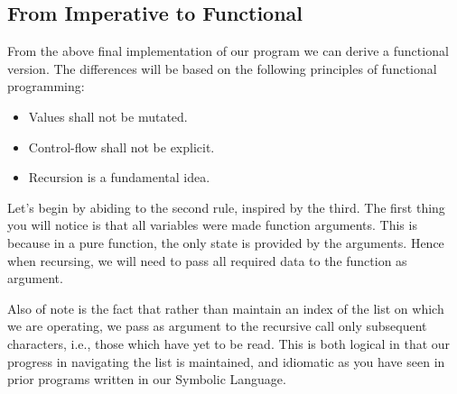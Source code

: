 \subsection{From Imperative to Functional}
From the above final implementation of our program we can derive a functional 
version. The differences will be based on the following principles of functional 
programming:

\begin{itemize}
  \item Values shall not be mutated.
  \item Control-flow shall not be explicit.
  \item Recursion is a fundamental idea.
\end{itemize}

Let's begin by abiding to the second rule, inspired by the third. The first thing 
you will notice is that all variables were made function arguments. This is because 
in a pure function, the only state is provided by the arguments. Hence when 
recursing, we will need to pass all required data to the function as argument.

Also of note is the fact that rather than maintain an index of the list on which we 
are operating, we pass as argument to the recursive call only subsequent characters, 
i.e., those which have yet to be read. This is both logical in that our progress in 
navigating the list is maintained, and idiomatic as you have seen in prior programs 
written in our Symbolic Language.

